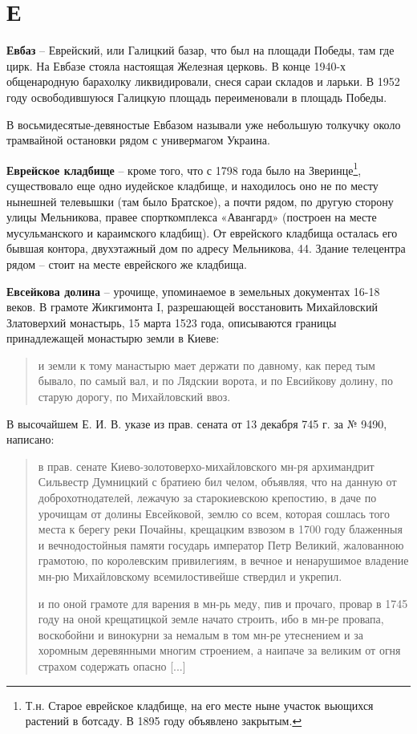 \chapter*{Е}

\textbf{Евбаз} – Еврейский, или Галицкий базар, что был на площади Победы, там где цирк. На Евбазе стояла настоящая Железная церковь. В конце 1940-х общенародную барахолку ликвидировали, снеся сараи складов и ларьки. В 1952 году освободившуюся Галицкую площадь переименовали в площадь Победы.

В восьмидесятые-девяностые Евбазом называли уже небольшую толкучку около трамвайной остановки рядом с универмагом Украина.\\

\medskip

\textbf{Еврейское кладбище} – кроме того, что с 1798 года было на Зверинце\footnote{Т.н. Старое еврейское кладбище, на его месте ныне участок вьющихся растений в ботсаду. В 1895 году объявлено закрытым.}, существовало еще одно иудейское кладбище, и находилось оно не по месту нынешней телевышки (там было Братское), а почти рядом, по другую сторону улицы Мельникова, правее спорткомплекса «Авангард» (построен на месте мусульманского и караимского кладбищ). От еврейского кладбища осталась его бывшая контора, двухэтажный дом по адресу Мельникова, 44. Здание телецентра рядом – стоит на месте еврейского же кладбища.\\

\medskip


\textbf{Евсейкова долина} – урочище, упоминаемое в земельных документах 16-18 веков. В грамоте Жикгимонта I, разрешающей восстановить Михайловский Златоверхий монастырь, 15 марта 1523 года, описываются границы принадлежащей монастырю земли в Киеве:

\begin{quotation}
и земли к тому манастырю мает держати по давному, как перед тым бывало, по самый вал, и по Лядскии ворота, и по Евсийкову долину, по старую дорогу, по Михайловский ввоз.
\end{quotation}

В высочайшем Е. И. В. указе из прав. сената от 13 декабря 745 г. за № 9490, написано: 

\begin{quotation}
в прав. сенате Киево-золотоверхо-михайловского мн-ря архимандрит Си\-львестр Думницкий с братиею бил челом, объявляя, что на данную от доброхотнодателей, лежачую за старокиевскою крепостию, в даче по урочищам от долины Евсейковой, землю со всем, которая сошлась того места к берегу реки Почайны, крещацким взвозом в 1700 году блаженныя и вечнодостойныя памяти государь император Петр Великий, жалованною грамотою, по королевским привилегиям, в вечное и ненарушимое владение мн-рю Михайловскому всемилостивейше ствердил и укрепил. 

и по оной грамоте для варения в мн-рь меду, пив и прочаго, провар в 1745 году на оной крещатицкой земле начато строить, ибо в мн-ре провапа, воскобойни и винокурни за немалым в том мн-ре утеснением и за хоромным деревянными многим строением, а наипаче за великим от огня страхом содержать опасно [...]
\end{quotation}


